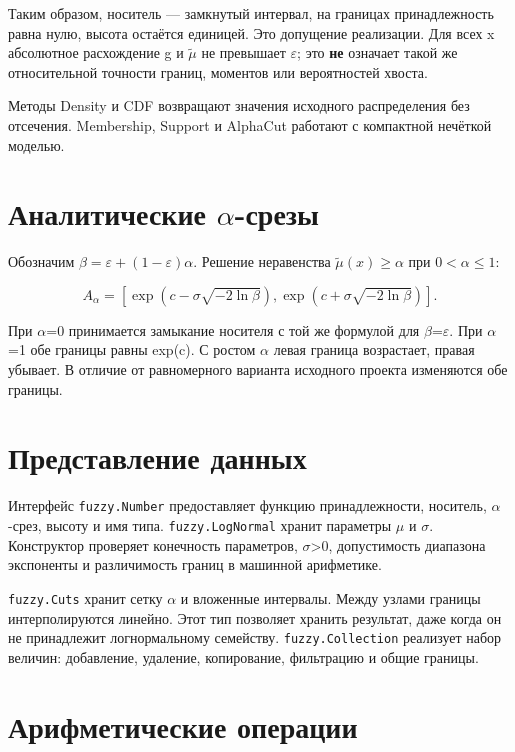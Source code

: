 \documentclass[fontsize=14pt,a4paper]{scrartcl}
\begin{document}
Таким образом, носитель — замкнутый интервал, на границах принадлежность равна нулю, высота остаётся единицей. Это допущение реализации. Для всех x абсолютное расхождение g и \(\widetilde\mu\) не превышает \(\varepsilon\); это \textbf{не} означает такой же относительной точности границ, моментов или вероятностей хвоста.

Методы Density и CDF возвращают значения исходного распределения без отсечения. Membership, Support и AlphaCut работают с компактной нечёткой моделью.

\section{Аналитические \(\alpha\)-срезы}

Обозначим $\beta=\varepsilon+(1-\varepsilon)\alpha$. Решение неравенства $\widetilde\mu(x)\geq\alpha$ при $0<\alpha\leq1$:

\[
A_\alpha=\left[\exp(c-\sigma\sqrt{-2\ln\beta}),\exp(c+\sigma\sqrt{-2\ln\beta})\right].
\]

При \(\alpha\)=0 принимается замыкание носителя с той же формулой для \(\beta\)=\(\varepsilon\). При \(\alpha\)=1 обе границы равны exp(c). С ростом \(\alpha\) левая граница возрастает, правая убывает. В отличие от равномерного варианта исходного проекта изменяются обе границы.

\section{Представление данных}

Интерфейс \texttt{fuzzy.Number} предоставляет функцию принадлежности, носитель, \(\alpha\)-срез, высоту и имя типа. \texttt{fuzzy.LogNormal} хранит параметры \(\mu\) и \(\sigma\). Конструктор проверяет конечность параметров, \(\sigma\)>0, допустимость диапазона экспоненты и различимость границ в машинной арифметике.

\texttt{fuzzy.Cuts} хранит сетку \(\alpha\) и вложенные интервалы. Между узлами границы интерполируются линейно. Этот тип позволяет хранить результат, даже когда он не принадлежит логнормальному семейству. \texttt{fuzzy.Collection} реализует набор величин: добавление, удаление, копирование, фильтрацию и общие границы.

\section{Арифметические операции}
\end{document}
